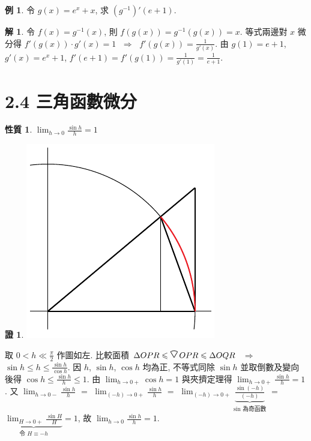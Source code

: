 \documentclass[12pt]{extarticle}
\newcommand{\ds}{\displaystyle}
\newcommand{\ie}{\;\Longrightarrow\;}
\theoremstyle{definition}
\newtheorem*{prp}{性質}
\newtheorem*{ex}{例}
\newtheorem*{sol}{解}
\newtheorem*{prf}{證}
\newcommand*{\SectorRadius}{3mm}
\newcommand*{\SectorHalfAngle}{30}
\newcommand*{\SectorLineWidth}{.7pt}
\newcommand*{\sector}{%
  \begin{pgfpicture}
    \pgfpathmoveto{\pgforigin}%
    \pgfpathlineto{\pgfpointpolar{90-(\SectorHalfAngle)}{\SectorRadius}}%
    \pgfarc{90-(\SectorHalfAngle)}{90+\SectorHalfAngle}{\SectorRadius}%
    \pgfpathclose
    \pgfsetlinewidth{\SectorLineWidth}%
    \pgfusepath{stroke}%
  \end{pgfpicture}%
}
\begin{document}
\begin{ex}
  令 $\ds g(x) = e^x + x$, 求 $\ds (g^{-1})'(e + 1)$. 
\end{ex}

\begin{sol}
  令 $\ds f(x) = g^{-1}(x)$, 則 $\ds f(g(x)) = g^{-1}(g(x)) = x$. 等式兩邊對 $x$ 微分得 $\ds f'(g(x))\cdot g'(x) = 1$ $\ie$ $\ds f'(g(x)) = \frac{1}{g'(x)}$. 由 $g(1) = e + 1$, $g'(x) = e^x + 1$, $\ds f'(e + 1) = f'(g(1)) = \frac{1}{g'(1)} = \frac{1}{e + 1}$. 
\end{sol}

\section*{2.4 三角函數微分}

\begin{prp}
  $\ds\lim_{h\to 0}\frac{\sin h}{h} = 1$
\end{prp}

\begin{prf}
  \begin{minipage}{0.35\textwidth}
    \includegraphics[scale=.75,page=2]{fig/sind.pdf}
  \end{minipage}
  \begin{minipage}{0.6\textwidth}
    取 $0 < h \ll \frac{\pi}{2}$ 作圖如左. 比較面積 $\ds\Delta OPR \leqslant\sector\,OPR \leqslant \Delta OQR$ $\ie$ $\ds\sin h\leqslant h \leqslant\frac{\sin h}{\cos h}$. 因 $h$, $\sin h$, $\cos h$ 均為正, 不等式同除 $\sin h$ 並取倒數及變向後得 $\ds\cos h\leqslant\frac{\sin h}{h}\leqslant 1$. 由 $\ds\lim_{h\to 0+}\cos h = 1$ 與夾擠定理得 $\ds\lim_{h\to 0+}\frac{\sin h}{h} = 1$. 又 $\ds\lim_{h\to 0-}\frac{\sin h}{h}$ $=$ $\ds\lim_{(-h)\to 0+}\frac{\sin h}{h}$ $=$ $\ds\lim_{(-h)\to 0+}\!\underbrace{\frac{\sin(-h)}{(-h)}}_{\text{$\sin$ 為奇函數}}$ $=$ $\ds\underbrace{\lim_{H\to 0+}\frac{\sin H}{H}}_{\text{令 $H\equiv -h$}} = 1$, 故 $\ds\lim_{h\to 0}\frac{\sin h}{h} = 1$.
  \end{minipage}
\end{prf}
\end{document}
